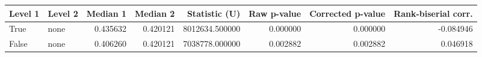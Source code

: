 \begin{tabular}{llrrrrrr}
\toprule
Level 1 & Level 2 & Median 1 & Median 2 & Statistic (U) & Raw p-value & Corrected p-value & Rank-biserial corr. \\
\midrule
True & none & 0.435632 & 0.420121 & 8012634.500000 & 0.000000 & 0.000000 & -0.084946 \\
False & none & 0.406260 & 0.420121 & 7038778.000000 & 0.002882 & 0.002882 & 0.046918 \\
\bottomrule
\end{tabular}
